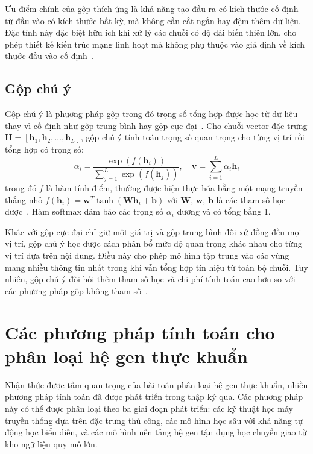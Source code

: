 Ưu điểm chính của gộp thích ứng là khả năng tạo đầu ra có kích thước cố định từ đầu vào có kích thước bất kỳ, mà không cần cắt ngắn hay đệm thêm dữ liệu. Đặc tính này đặc biệt hữu ích khi xử lý các chuỗi có độ dài biến thiên lớn, cho phép thiết kế kiến trúc mạng linh hoạt mà không phụ thuộc vào giả định về kích thước đầu vào cố định~\cite{he2015spatial}.

\subsection{Gộp chú ý}
\label{subsec:attention_pooling}

Gộp chú ý là phương pháp gộp trong đó trọng số tổng hợp được học từ dữ liệu thay vì cố định như gộp trung bình hay gộp cực đại~\cite{lin2017structured}. Cho chuỗi vector đặc trưng $\mathbf{H} = [\mathbf{h}_1, \mathbf{h}_2, \ldots, \mathbf{h}_L]$, gộp chú ý tính toán trọng số quan trọng cho từng vị trí rồi tổng hợp có trọng số:
\begin{equation}
\alpha_i = \frac{\exp(f(\mathbf{h}_i))}{\sum_{j=1}^{L} \exp(f(\mathbf{h}_j))}, \quad \mathbf{v} = \sum_{i=1}^{L} \alpha_i \mathbf{h}_i
\label{eq:attention_pooling}
\end{equation}
trong đó $f$ là hàm tính điểm, thường được hiện thực hóa bằng một mạng truyền thẳng nhỏ $f(\mathbf{h}_i) = \mathbf{w}^T \tanh(\mathbf{W} \mathbf{h}_i + \mathbf{b})$ với $\mathbf{W}$, $\mathbf{w}$, $\mathbf{b}$ là các tham số học được~\cite{yang2016hierarchical}. Hàm softmax đảm bảo các trọng số $\alpha_i$ dương và có tổng bằng 1.

Khác với gộp cực đại chỉ giữ một giá trị và gộp trung bình đối xử đồng đều mọi vị trí, gộp chú ý học được cách phân bổ mức độ quan trọng khác nhau cho từng vị trí dựa trên nội dung. Điều này cho phép mô hình tập trung vào các vùng mang nhiều thông tin nhất trong khi vẫn tổng hợp tín hiệu từ toàn bộ chuỗi. Tuy nhiên, gộp chú ý đòi hỏi thêm tham số học và chi phí tính toán cao hơn so với các phương pháp gộp không tham số~\cite{lin2017structured}.

\section{Các phương pháp tính toán cho phân loại hệ gen thực khuẩn}
\label{sec:phage_classification_methods}

Nhận thức được tầm quan trọng của bài toán phân loại hệ gen thực khuẩn, nhiều phương pháp tính toán đã được phát triển trong thập kỷ qua. Các phương pháp này có thể được phân loại theo ba giai đoạn phát triển: các kỹ thuật học máy truyền thống dựa trên đặc trưng thủ công, các mô hình học sâu với khả năng tự động học biểu diễn, và các mô hình nền tảng hệ gen tận dụng học chuyển giao từ kho ngữ liệu quy mô lớn.

